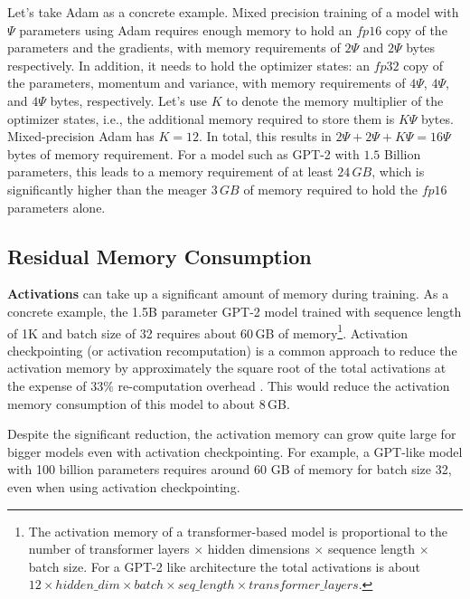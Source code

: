 \documentclass{article}
\begin{document}
Let's take Adam as a concrete example.  Mixed precision training of a model with $\Psi$ parameters using Adam requires enough memory to hold an $fp16$ copy of the parameters and the gradients, with memory requirements of $2\Psi$ and $2\Psi$ bytes respectively.  In addition, it needs to hold the optimizer states: an $fp32$ copy of the parameters, momentum and variance, with memory requirements of $4\Psi$, $4\Psi$, and $4\Psi$ bytes, respectively.  Let's use $K$ to denote the memory multiplier of the optimizer states, i.e., the additional memory required to store them is $K\Psi$ bytes. Mixed-precision Adam has $K=12$. In total, this results in $2\Psi + 2\Psi + K\Psi = 16\Psi$ bytes of memory requirement. 
For a model such as GPT-2 with $1.5$ Billion parameters, this leads to a memory requirement of at least $24\,GB$, which is significantly higher than the meager $3\,GB$ of memory required to hold the $fp16$ parameters alone.

\subsection{Residual Memory Consumption}
\textbf{Activations} can take up a significant amount of memory \cite{DBLP:journals/corr/ChenXZG16} during training.  As a concrete example, the 1.5B parameter GPT-2 model trained with sequence length of 1K and batch size of 32 requires about 60\,GB of memory\footnote{The activation memory of a transformer-based model is proportional to the number of transformer layers $\times$ hidden dimensions $\times$  sequence length $\times$ batch size.  For a GPT-2 like architecture the total activations is about  $12 \times hidden\_dim \times batch \times seq\_length \times transformer\_layers$.}.  Activation checkpointing (or activation recomputation) is a common approach to reduce the activation memory by approximately the square root of the total activations at the expense of $33\%$ re-computation overhead \cite{DBLP:journals/corr/ChenXZG16}. This would reduce the activation memory consumption of this model to about 8\,GB.

Despite the significant reduction, the activation memory can grow quite large for bigger models even with activation checkpointing. For example, a GPT-like model with 100 billion parameters requires around 60 GB of memory for batch size 32, even when using activation checkpointing.
\end{document}
